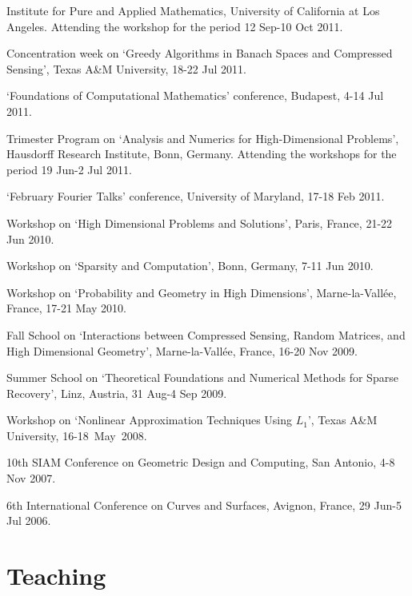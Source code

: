 \documentclass[11pt]{article}
\begin{document}
Institute for Pure and Applied Mathematics, University of California at Los Angeles.
Attending the workshop for the period 12 Sep-10 Oct 2011.
\item Concentration week on `Greedy Algorithms in Banach Spaces and Compressed Sensing', Texas A\&M University, 18-22 Jul 2011.
\item `Foundations of Computational Mathematics' conference, Budapest, 4-14 Jul 2011.
\item Trimester Program on `Analysis and Numerics for High-Dimensional Problems', Hausdorff Research Institute, Bonn, Germany.
Attending the workshops for the period 19 Jun-2 Jul 2011.
\item `February Fourier Talks' conference, University of Maryland, 17-18 Feb 2011.
\item Workshop on `High Dimensional Problems and Solutions', Paris, France, 21-22 Jun 2010.
\item Workshop on `Sparsity and Computation', Bonn, Germany, 7-11 Jun 2010.
\item Workshop on `Probability and Geometry in High Dimensions', Marne-la-Vall\'ee, France, 17-21 May 2010.
\item Fall School on `Interactions between Compressed Sensing, Random Matrices, and High Dimensional Geometry', Marne-la-Vall\'ee, France, 16-20 Nov 2009.
\item Summer School on `Theoretical Foundations and Numerical Methods for Sparse Recovery', Linz, Austria, 31 Aug-4 Sep 2009.
\item Workshop on `Nonlinear  Approximation Techniques Using  $L_1$', Texas A\&M University, 16-18~May~2008.
\item 10th SIAM Conference on Geometric Design and Computing, San Antonio, 4-8 Nov 2007.
\item 6th International Conference on Curves and Surfaces, Avignon, France, 29 Jun-5 Jul  2006.
\eitemize


\section{Teaching}
\end{document}
